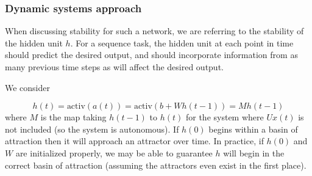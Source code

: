 \documentclass{beamer}
\begin{document}
\begin{frame}
  \frametitle{Dynamic systems approach}
  When discussing stability for such a network, we are referring to the stability of the hidden unit $h$. For a sequence task, the hidden unit at each point in time should predict the desired output, and should incorporate information from as many previous time steps as will affect the desired output.

    \vspace{0.5cm}
  
  We consider

\begin{equation*}
h(t) = \mbox{activ}(a(t)) = \mbox{activ}(b + W h(t-1)) = M h(t-1)
\end{equation*}
%
where $M$ is the map taking $h(t - 1)$ to $h(t)$ for the system where $Ux(t)$ is not included (so the system is autonomous). If $h(0)$ begins within a basin of attraction then it will approach an attractor over time. In practice, if $h(0)$ and $W$ are initialized properly, we may be able to guarantee $h$ will begin in the correct basin of attraction (assuming the attractors even exist in the first place).

\end{frame}
\end{document}
